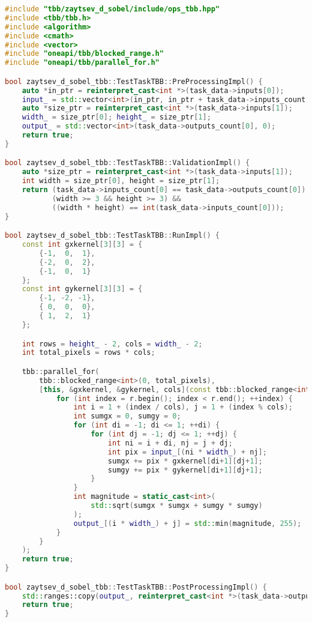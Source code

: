 \documentclass[12pt]{article}
\begin{document}
\begin{lstlisting}[language=C++, caption={Параллельная реализация с Intel TBB}]
#include "tbb/zaytsev_d_sobel/include/ops_tbb.hpp"
#include <tbb/tbb.h>
#include <algorithm>
#include <cmath>
#include <vector>
#include "oneapi/tbb/blocked_range.h"
#include "oneapi/tbb/parallel_for.h"

bool zaytsev_d_sobel_tbb::TestTaskTBB::PreProcessingImpl() {
    auto *in_ptr = reinterpret_cast<int *>(task_data->inputs[0]);
    input_ = std::vector<int>(in_ptr, in_ptr + task_data->inputs_count[0]);
    auto *size_ptr = reinterpret_cast<int *>(task_data->inputs[1]);
    width_ = size_ptr[0]; height_ = size_ptr[1];
    output_ = std::vector<int>(task_data->outputs_count[0], 0);
    return true;
}

bool zaytsev_d_sobel_tbb::TestTaskTBB::ValidationImpl() {
    auto *size_ptr = reinterpret_cast<int *>(task_data->inputs[1]);
    int width = size_ptr[0], height = size_ptr[1];
    return (task_data->inputs_count[0] == task_data->outputs_count[0]) &&
           (width >= 3 && height >= 3) &&
           ((width * height) == int(task_data->inputs_count[0]));
}

bool zaytsev_d_sobel_tbb::TestTaskTBB::RunImpl() {
    const int gxkernel[3][3] = {
        {-1,  0,  1},
        {-2,  0,  2},
        {-1,  0,  1}
    };
    const int gykernel[3][3] = {
        {-1, -2, -1},
        { 0,  0,  0},
        { 1,  2,  1}
    };

    int rows = height_ - 2, cols = width_ - 2;
    int total_pixels = rows * cols;

    tbb::parallel_for(
        tbb::blocked_range<int>(0, total_pixels),
        [this, &gxkernel, &gykernel, cols](const tbb::blocked_range<int> &r) {
            for (int index = r.begin(); index < r.end(); ++index) {
                int i = 1 + (index / cols), j = 1 + (index % cols);
                int sumgx = 0, sumgy = 0;
                for (int di = -1; di <= 1; ++di) {
                    for (int dj = -1; dj <= 1; ++dj) {
                        int ni = i + di, nj = j + dj;
                        int pix = input_[(ni * width_) + nj];
                        sumgx += pix * gxkernel[di+1][dj+1];
                        sumgy += pix * gykernel[di+1][dj+1];
                    }
                }
                int magnitude = static_cast<int>(
                    std::sqrt(sumgx * sumgx + sumgy * sumgy)
                );
                output_[(i * width_) + j] = std::min(magnitude, 255);
            }
        }
    );
    return true;
}

bool zaytsev_d_sobel_tbb::TestTaskTBB::PostProcessingImpl() {
    std::ranges::copy(output_, reinterpret_cast<int *>(task_data->outputs[0]));
    return true;
}
\end{lstlisting}
\end{document}
